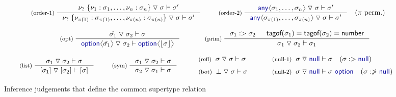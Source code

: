 \documentclass[10pt,preprint,blind,clearpagebib]{sigplanconf}
\newcommand{\langl}{\begin{picture}(4.5,7)
\put(1.1,2.5){\rotatebox{60}{\line(1,0){5.5}}}
\put(1.1,2.5){\rotatebox{300}{\line(1,0){5.5}}}
\end{picture}}
\newcommand{\rangl}{\begin{picture}(4.5,7)
\put(.9,2.5){\rotatebox{120}{\line(1,0){5.5}}}
\put(.9,2.5){\rotatebox{240}{\line(1,0){5.5}}}
\end{picture}}
\newcommand{\kvd}[1]{\textnormal{\textcolor{kvdclr}{\sffamily #1}}}
\newcommand{\ident}[1]{\textnormal{\sffamily #1}}
\newcommand{\tsep}[0]{\; \triangledown \;}
\newcommand{\dropopt}[1]{\lfloor#1\rfloor}
\newcommand{\tytagof}{\ident{tagof}}
\begin{document}
\begin{figure}[t]
\begin{equation*}
\inference[(order-1)\;]
  { \nu_? \; \{ \nu_1 : \sigma_1, \ldots, \nu_n : \sigma_n \} \tsep \sigma \vdash \sigma' }
  { \nu_? \; \{ \nu_{\pi(1)} : \sigma_{\pi(1)}, \ldots, \nu_{\pi(n)} : \sigma_{\pi(n)} \} \tsep \sigma \vdash \sigma' }
\quad
\inference[(order-2)\;]
  { \kvd{any}\langl\sigma_1, \ldots, \sigma_n\rangl \tsep \sigma \vdash \sigma' }
  { \kvd{any}\langl\sigma_{\pi(1)}, \ldots, \sigma_{\pi(n)}\rangl \tsep \sigma \vdash \sigma' }
\quad (\pi~\textnormal{perm.})  
\end{equation*}
\vspace{-2em}

\begin{equation*}
\hspace{3em}
\inference[(opt)\;]
  {\hat{\sigma_1} \tsep \sigma_2 \vdash \sigma}
  {\kvd{option}\langl\hat{\sigma_1}\rangl \tsep \sigma_2 \vdash \kvd{option}\langl\dropopt{\sigma}\rangl}
\qquad
\inference[(prim)\;]
  {\sigma_1 :> \sigma_2 &
   \tytagof(\sigma_1) = \tytagof(\sigma_2) = \ident{number} }
  {\sigma_1 \tsep \sigma_2 \vdash \sigma_1}\quad
\end{equation*}
\vspace{-2em}

\begin{equation*}
\inference[(list)\;]
  {\sigma_1 \tsep \sigma_2 \vdash \sigma}
  {[\sigma_1] \tsep [\sigma_2] \vdash [\sigma]}
\quad
\inference[(sym)\;]
  {\sigma_1 \tsep \sigma_2 \vdash \sigma}
  {\sigma_2 \tsep \sigma_1 \vdash \sigma}
%
\quad
\begin{array}{l}
 \textnormal{\footnotesize{(refl)}}\;\; \sigma \tsep \sigma \vdash \sigma\\[0.6em]
 \textnormal{\footnotesize{(bot)}}\;\; \bot \tsep \sigma \vdash \sigma
\end{array}
%
\quad
 \begin{array}{l}
 \textnormal{\footnotesize{(null-1)}}\;\; \sigma \tsep \kvd{null} \vdash \sigma \quad(\sigma :> \kvd{null}) \\[0.6em]
 \textnormal{\footnotesize{(null-2)}}\;\; \sigma \tsep \kvd{null} \vdash \sigma~\kvd{option} \quad(\sigma :\ngtr \kvd{null})
 \end{array}
\end{equation*}

\caption{Inference judgements that define the common supertype relation}
\label{fig:subtyping-cst}
\end{figure}
\end{document}
